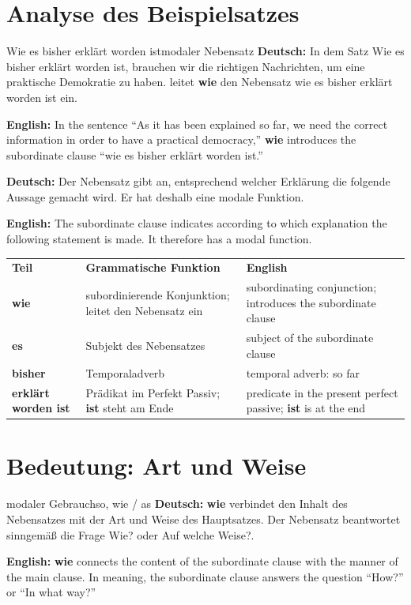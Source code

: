 \documentclass[a4paper,11pt]{article}
\newcommand{\GermanText}[1]{\textbf{Deutsch: }#1\par}
\newcommand{\EnglishText}[1]{{\small\color{SoftGray}\textbf{English: }#1\par}}
\begin{document}
\section{Analyse des Beispielsatzes}

\begin{grammarentry}{Wie es bisher erklärt worden ist}{modaler Nebensatz}
\GermanText{In dem Satz \glqq Wie es bisher erklärt worden ist, brauchen wir die richtigen Nachrichten, um eine praktische Demokratie zu haben.\grqq{} leitet \textbf{wie} den Nebensatz \glqq wie es bisher erklärt worden ist\grqq{} ein.}
\EnglishText{In the sentence ``As it has been explained so far, we need the correct information in order to have a practical democracy,'' \textbf{wie} introduces the subordinate clause ``wie es bisher erklärt worden ist.''}

\GermanText{Der Nebensatz gibt an, entsprechend welcher Erklärung die folgende Aussage gemacht wird. Er hat deshalb eine modale Funktion.}
\EnglishText{The subordinate clause indicates according to which explanation the following statement is made. It therefore has a modal function.}
\end{grammarentry}

\begin{longtable}{>{\bfseries}p{4.1cm}|p{5.1cm}|p{5.1cm}}
\rowcolor{HeaderBlueDark}
\color{white}\textbf{Teil} &
\color{white}\textbf{Grammatische Funktion} &
\color{white}\textbf{English} \\
wie & subordinierende Konjunktion; leitet den Nebensatz ein & subordinating conjunction; introduces the subordinate clause \\
es & Subjekt des Nebensatzes & subject of the subordinate clause \\
bisher & Temporaladverb & temporal adverb: so far \\
erklärt worden ist & Prädikat im Perfekt Passiv; \textbf{ist} steht am Ende & predicate in the present perfect passive; \textbf{ist} is at the end \\
\end{longtable}

\section{Bedeutung: Art und Weise}

\begin{grammarentry}{modaler Gebrauch}{so, wie / as}
\GermanText{\textbf{wie} verbindet den Inhalt des Nebensatzes mit der Art und Weise des Hauptsatzes. Der Nebensatz beantwortet sinngemäß die Frage \glqq Wie?\grqq{} oder \glqq Auf welche Weise?\grqq.}
\EnglishText{\textbf{wie} connects the content of the subordinate clause with the manner of the main clause. In meaning, the subordinate clause answers the question ``How?'' or ``In what way?''}
\end{grammarentry}
\end{document}
